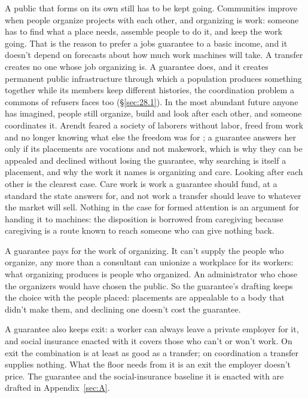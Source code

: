 A public that forms on its own still has to be kept going. Communities improve when people organize projects with each other, and organizing is work: someone has to find what a place needs, assemble people to do it, and keep the work going. That is the reason to prefer a jobs guarantee to a basic income, and it doesn't depend on forecasts about how much work machines will take. A transfer creates no one whose job organizing is. A guarantee does, and it creates permanent public infrastructure through which a population produces something together while its members keep different histories, the coordination problem a commons of refusers faces too (\S\ref{sec:28.1}). In the most abundant future anyone has imagined, people still organize, build and look after each other, and someone coordinates it. Arendt feared a society of laborers without labor, freed from work and no longer knowing what else the freedom was for \autocite{arendt1958human}; a guarantee answers her only if its placements are vocations and not makework, which is why they can be appealed and declined without losing the guarantee, why searching is itself a placement, and why the work it names is organizing and care. Looking after each other is the clearest case. Care work is work a guarantee should fund, at a standard the state answers for, and not work a transfer should leave to whatever the market will sell. Nothing in the case for formed attention is an argument for handing it to machines: the disposition is borrowed from caregiving because caregiving is a route known to reach someone who can give nothing back.

A guarantee pays for the work of organizing. It can't supply the people who organize, any more than a consultant can unionize a workplace for its workers: what organizing produces is people who organized. An administrator who chose the organizers would have chosen the public. So the guarantee's drafting keeps the choice with the people placed: placements are appealable to a body that didn't make them, and declining one doesn't cost the guarantee.

A guarantee also keeps exit: a worker can always leave a private employer for it, and social insurance enacted with it covers those who can't or won't work. On exit the combination is at least as good as a transfer; on coordination a transfer supplies nothing. What the floor needs from it is an exit the employer doesn't price. The guarantee and the social-insurance baseline it is enacted with are drafted in Appendix~\ref{sec:A}.
